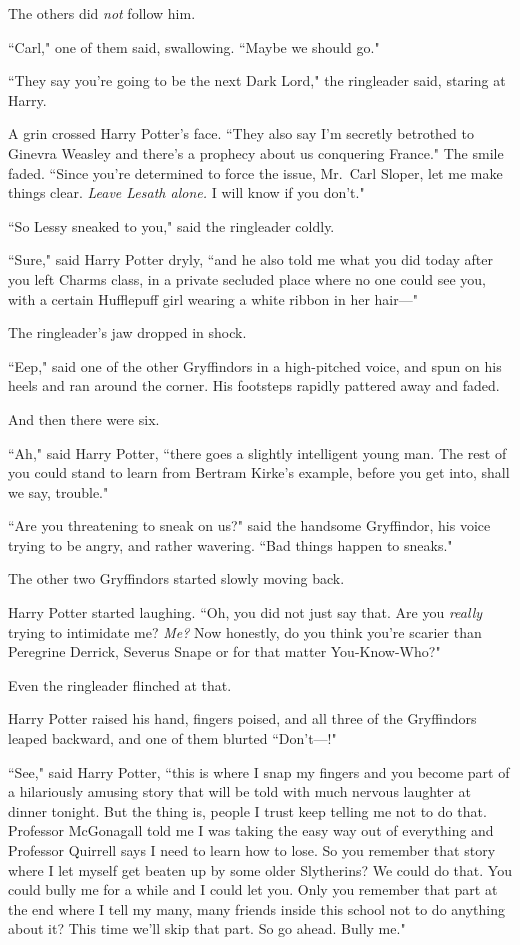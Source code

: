 The others did \emph{not} follow him.

``Carl," one of them said, swallowing. ``Maybe we should go."

``They say you're going to be the next Dark Lord," the ringleader said, staring at Harry.

A grin crossed Harry Potter's face. ``They also say I'm secretly betrothed to Ginevra Weasley and there's a prophecy about us conquering France." The smile faded. ``Since you're determined to force the issue, Mr.~Carl Sloper, let me make things clear. \emph{Leave Lesath alone.} I will know if you don't."

``So Lessy sneaked to you," said the ringleader coldly.

``Sure," said Harry Potter dryly, ``and he also told me what you did today after you left Charms class, in a private secluded place where no one could see you, with a certain Hufflepuff girl wearing a white ribbon in her hair—"

The ringleader's jaw dropped in shock.

``Eep," said one of the other Gryffindors in a high-pitched voice, and spun on his heels and ran around the corner. His footsteps rapidly pattered away and faded.

And then there were six.

``Ah," said Harry Potter, ``there goes a slightly intelligent young man. The rest of you could stand to learn from Bertram Kirke's example, before you get into, shall we say, trouble."

``Are you threatening to sneak on us?" said the handsome Gryffindor, his voice trying to be angry, and rather wavering. ``Bad things happen to sneaks."

The other two Gryffindors started slowly moving back.

Harry Potter started laughing. ``Oh, you did not just say that. Are you \emph{really} trying to intimidate me? \emph{Me?} Now honestly, do you think you're scarier than Peregrine Derrick, Severus Snape or for that matter You-Know-Who?"

Even the ringleader flinched at that.

Harry Potter raised his hand, fingers poised, and all three of the Gryffindors leaped backward, and one of them blurted ``Don't—!"

``See," said Harry Potter, ``this is where I snap my fingers and you become part of a hilariously amusing story that will be told with much nervous laughter at dinner tonight. But the thing is, people I trust keep telling me not to do that. Professor McGonagall told me I was taking the easy way out of everything and Professor Quirrell says I need to learn how to lose. So you remember that story where I let myself get beaten up by some older Slytherins? We could do that. You could bully me for a while and I could let you. Only you remember that part at the end where I tell my many, many friends inside this school not to do anything about it? This time we'll skip that part. So go ahead. Bully me."

